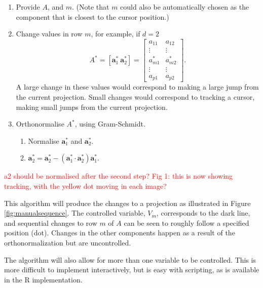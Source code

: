 \documentclass[]{interact}
\theoremstyle{plain}%
\theoremstyle{definition}
\theoremstyle{remark}
\providecommand{\tightlist}{%
  \setlength{\itemsep}{0pt}\setlength{\parskip}{0pt}}
\def\tightlist{}
\begin{document}
\begin{enumerate}
\def\labelenumi{\arabic{enumi}.}
\tightlist
\item
  Provide \(A\), and \(m\). (Note that \(m\) could also be automatically
  chosen as the component that is closest to the cursor position.)
\item
  Change values in row \(m\), for example, if \(d=2\) \[
  A^* = [ \boldsymbol{a}^*_1~\boldsymbol{a}^*_2 ] = \left[ \begin{array}{cc} a_{11} & a_{12}\\
                             \vdots & \vdots \\
                             a^*_{m1} & a^*_{m2}\\
                             \vdots & \vdots \\
                             a_{p1} & a_{p2} 
       \end{array}\right].
  \] \noindent A large change in these values would correspond to making
  a large jump from the current projection. Small changes would
  correspond to tracking a cursor, making small jumps from the current
  projection.
\item
  Orthonormalise \(A^*\), using Gram-Schmidt.

  \begin{enumerate}
  \def\labelenumii{\roman{enumii}.}
  \tightlist
  \item
    Normalise \(\boldsymbol{a}^*_1\) and \(\boldsymbol{a}^*_2\).
  \item
    \(\boldsymbol{a}^*_2 = \boldsymbol{a}^*_2 - (\boldsymbol{a}^*_1\cdot\boldsymbol{a}^*_2)\boldsymbol{a}^*_1\).
  \end{enumerate}
\end{enumerate}

\textcolor{red}{a2 should be normalised after the second step? Fig 1: this is now showing tracking, with the yellow dot moving in each image?}

This algorithm will produce the changes to a projection as illustrated
in Figure \ref{fig:manualsequence}. The controlled variable, \(V_m\),
corresponds to the dark line, and sequential changes to row \(m\) of
\(A\) can be seen to roughly follow a specified position (dot). Changes
in the other components happen as a result of the orthonormalization but
are uncontrolled.

The algorithm will also allow for more than one variable to be
controlled. This is more difficult to implement interactively, but is
easy with scripting, as is available in the R implementation.
\end{document}
